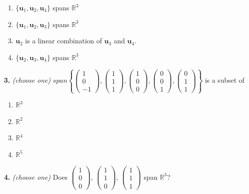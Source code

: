 \documentclass[10pt,a4paper]{article}
\begin{document}
\begin{enumerate}[label=(\Alph*)]
\item \(\{\mathbf{u}_1,\mathbf{u}_2,\mathbf{u}_4\}\) spans \(\mathbb{R}^3\)
\item \(\{\mathbf{u}_1,\mathbf{u}_2,\mathbf{u}_3\}\) spans \(\mathbb{R}^3\)
\item \(\mathbf{u}_2\) is a linear combination of \(\mathbf{u}_3\) and \(\mathbf{u}_4\).
\item \(\{\mathbf{u}_2,\mathbf{u}_3,\mathbf{u}_4\}\) spans \(\mathbb{R}^3\)
\end{enumerate}
\smallskip
\textbf{3.} \textit{(choose one)} \(span\left\{\begin{pmatrix}1\\0\\-1\end{pmatrix},\begin{pmatrix}1\\1\\1\end{pmatrix},\begin{pmatrix}1\\0\\0\end{pmatrix},\begin{pmatrix}0\\0\\1\end{pmatrix},\begin{pmatrix}0\\1\\1\end{pmatrix}\right\}\) is a subset of

\begin{enumerate}[label=(\Alph*)]
\item \(\mathbb{R}^3\)
\item \(\mathbb{R}^2\)
\item \(\mathbb{R}^4\)
\item \(\mathbb{R}^5\)
\end{enumerate}
\smallskip
\textbf{4.} \textit{(choose one)} Does \(\begin{pmatrix}1\\0\\0\end{pmatrix}\), \(\begin{pmatrix}1\\1\\0\end{pmatrix}\), \(\begin{pmatrix}1\\1\\1\end{pmatrix}\) span \(\mathbb{R}^3\)?
\end{document}
